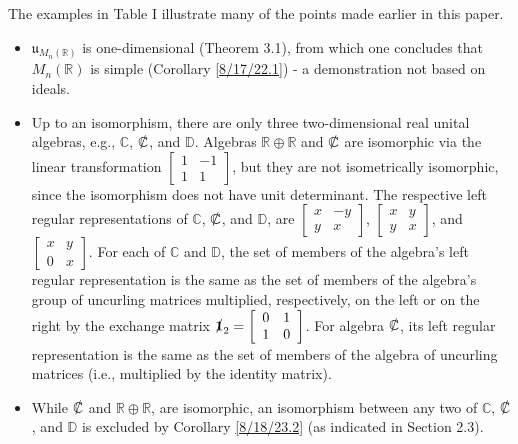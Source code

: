 \documentclass{amsart}
\numberwithin{equation}{section}
\theoremstyle{definition}
\numberwithin{theorem}{section}
\begin{document}
The examples in Table I illustrate many of the points made earlier in this paper.    
 
\begin{itemize}\item $\mathfrak{u}_{M_n(\mathbb{R})}$ is one-dimensional (Theorem 3.1), from which one concludes that $M_n(\mathbb{R})$ is simple (Corollary \ref{8/17/22.1}) - a demonstration not based on ideals.
\item Up to an isomorphism, there are only three two-dimensional real unital algebras, e.g., $\mathbb{C}$, $\slashed{\mathbb{C}}$, and $\mathbb{D}$.  Algebras $\mathbb{R}\oplus\mathbb{R}$ and $\slashed{\mathbb{C}}$ are isomorphic via the linear transformation $\left[\begin{array}{ccc}
 1 & -1   \\ 
 1 & 1    
\end{array}\right]$, but they are not isometrically isomorphic, since the isomorphism does not have unit determinant.  The respective left regular representations of $\mathbb{C}$, $\slashed{\mathbb{C}}$, and $\mathbb{D}$, are $\left[\begin{array}{ccc}
 x & -y   \\ 
 y & x    
\end{array}\right]$, $\left[\begin{array}{ccc}
 x & y   \\ 
 y & x    
\end{array}\right]$, and $\left[\begin{array}{ccc}
 x & y   \\ 
 0 & x    
\end{array}\right]$.  For each of $\mathbb{C}$ and $\mathbb{D}$, the set of members of the algebra's left regular representation is the same as the set of members of the algebra's group of uncurling matrices multiplied, respectively, on the left or on the right by the exchange matrix $\slashed{\mathbf{1}}_2 = \left[\begin{array}{ccc}
 0 & 1   \\ 
 1 & 0    
\end{array}\right]$. For algebra $\slashed{\mathbb{C}}$, its left regular representation is the same as the set of members of the algebra of uncurling matrices (i.e., multiplied by the identity matrix).
\item While $\slashed{\mathbb{C}}$ and $\mathbb{R}\oplus\mathbb{R}$, are isomorphic, an isomorphism between any two of $\mathbb{C}$, $\slashed{\mathbb{C}}$, and $\mathbb{D}$ is excluded by Corollary \ref{8/18/23.2} (as indicated in Section 2.3).  

\end{itemize}
\end{document}
